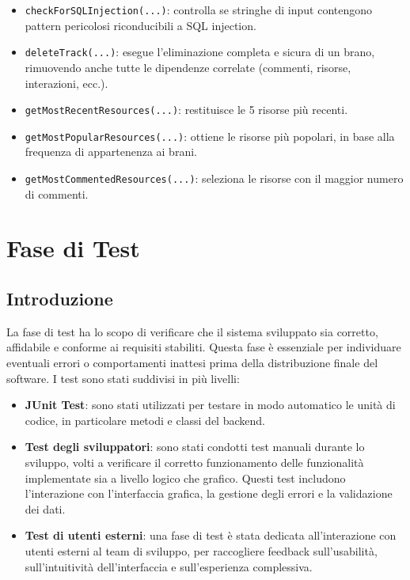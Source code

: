 \documentclass[a4paper]{article}
\begin{document}
\begin{itemize}
    \item \texttt{checkForSQLInjection(...)}: controlla se stringhe di input contengono pattern pericolosi riconducibili a SQL injection.
    \item \texttt{deleteTrack(...)}: esegue l'eliminazione completa e sicura di un brano, rimuovendo anche tutte le dipendenze correlate (commenti, risorse, interazioni, ecc.).
    \item \texttt{getMostRecentResources(...)}: restituisce le 5 risorse più recenti.
    \item \texttt{getMostPopularResources(...)}: ottiene le risorse più popolari, in base alla frequenza di appartenenza ai brani.
    \item \texttt{getMostCommentedResources(...)}: seleziona le risorse con il maggior numero di commenti.
\end{itemize}

\section{Fase di Test}
\subsection{Introduzione}
La fase di test ha lo scopo di verificare che il sistema sviluppato sia corretto, affidabile e conforme ai requisiti stabiliti.
Questa fase è essenziale per individuare eventuali errori o comportamenti inattesi prima della distribuzione finale del software.
I test sono stati suddivisi in più livelli:

\begin{itemize}
    \item \textbf{JUnit Test}: sono stati utilizzati per testare in modo automatico le unità di codice, in particolare metodi e classi del backend.

    \item \textbf{Test degli sviluppatori}: sono stati condotti test manuali durante lo sviluppo, volti a verificare il corretto funzionamento delle funzionalità implementate sia a livello logico che grafico. Questi test includono l’interazione con l’interfaccia grafica, la gestione degli errori e la validazione dei dati.

    \item \textbf{Test di utenti esterni}: una fase di test è stata dedicata all’interazione con utenti esterni al team di sviluppo, per raccogliere feedback sull’usabilità, sull’intuitività dell’interfaccia e sull’esperienza complessiva.
\end{itemize}
\end{document}
